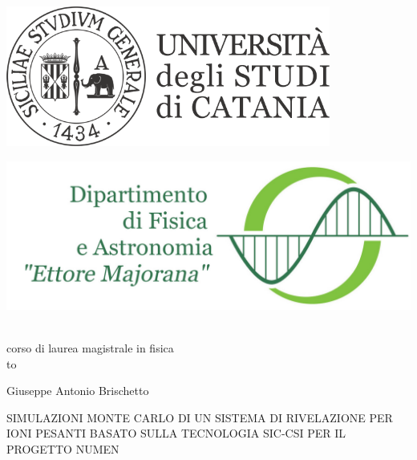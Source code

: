 \documentclass[10pt,foldmark,notumble]{leaflet}
\begin{document}
\begin{center}
\begin{minipage}[c]{0.45\textwidth}
\begin{flushleft}
\includegraphics[width=0.8\textwidth]{logo_unict_orizzontale}
\end{flushleft}
\end{minipage}
\hfill
\begin{minipage}[c]{0.45\textwidth}
\begin{flushright}
\includegraphics[width=\textwidth]{logo_dfa_orizzontale}
\end{flushright}
\end{minipage}\\
\medskip
{\sc corso di laurea magistrale in fisica}\\
\hbox to \textwidth{\hrulefill}

\vspace{3truecm}

{\sc Giuseppe Antonio Brischetto}

\vfill

\uppercase{\sc Simulazioni Monte Carlo di un sistema di rivelazione per ioni pesanti basato sulla tecnologia SiC-CsI per il progetto NUMEN}

\vfill


\end{center}
\end{document}
